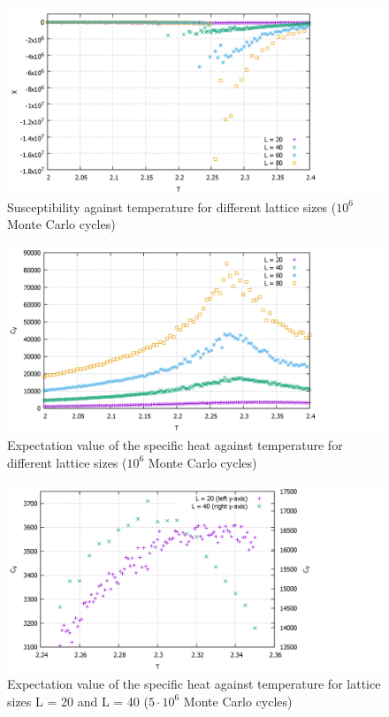 \documentclass[10pt,a4paper]{article}
\begin{document}
\begin{figure}[h]
	\includegraphics[scale = 0.25]{sus_all.png}
	\centering
	\caption{Susceptibility against temperature for different lattice sizes ($10^6$ Monte Carlo cycles)}
	\label{chi_all}
\end{figure}

\begin{figure}[h]
	\includegraphics[scale = 0.25]{cv_all.png}
	\centering
	\caption{Expectation value of the specific heat against temperature for different lattice sizes ($10^6$ Monte Carlo cycles)}
	\label{cv_all}
\end{figure}

\begin{figure}[h]
	\includegraphics[scale = 0.25]{cv2040.png}
	\centering
	\caption{Expectation value of the specific heat against temperature for lattice sizes L = 20 and L = 40 ($5 \cdot 10^6$ Monte Carlo cycles)}
	\label{cv2040}
\end{figure}
\end{document}
